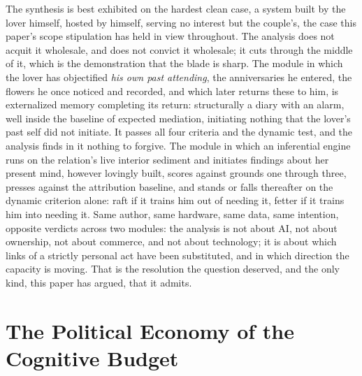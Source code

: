 \documentclass[11pt,a4paper]{article}
\begin{document}
The synthesis is best exhibited on the hardest clean case, a system built by the lover himself, hosted by himself, serving no interest but the couple's, the case this paper's scope stipulation has held in view throughout. The analysis does not acquit it wholesale, and does not convict it wholesale; it cuts through the middle of it, which is the demonstration that the blade is sharp. The module in which the lover has objectified \emph{his own past attending}, the anniversaries he entered, the flowers he once noticed and recorded, and which later returns these to him, is externalized memory completing its return: structurally a diary with an alarm, well inside the baseline of expected mediation, initiating nothing that the lover's past self did not initiate. It passes all four criteria and the dynamic test, and the analysis finds in it nothing to forgive. The module in which an inferential engine runs on the relation's live interior sediment and initiates findings about her present mind, however lovingly built, scores against grounds one through three, presses against the attribution baseline, and stands or falls thereafter on the dynamic criterion alone: raft if it trains him out of needing it, fetter if it trains him into needing it. Same author, same hardware, same data, same intention, opposite verdicts across two modules: the analysis is not about AI, not about ownership, not about commerce, and not about technology; it is about which links of a strictly personal act have been substituted, and in which direction the capacity is moving. That is the resolution the question deserved, and the only kind, this paper has argued, that it admits.

\section{The Political Economy of the Cognitive Budget}
\label{p02:sec:poleconomy}
\end{document}
